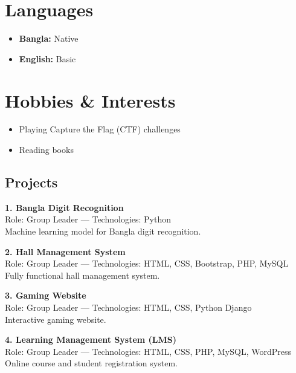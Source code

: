 \documentclass[a4paper,10pt]{article}
\begin{document}
\begin{multicols}{2}
\begin{flushleft}
        \section*{Languages}
        \begin{itemize}[left=0em, labelsep=1em, label=\textbullet, itemsep=0.2em]
            \item \textbf{Bangla:} Native
            \item \textbf{English:} Basic
        \end{itemize}

        \section*{Hobbies \& Interests}
        \begin{itemize}[left=0em, labelsep=1em, label=\textbullet, itemsep=0.2em]
            \item Playing Capture the Flag (CTF) challenges
            \item Reading books
        \end{itemize}
    \end{flushleft}

    \begin{flushleft}
        \section*{Projects}
        \noindent \textbf{1. Bangla Digit Recognition} \\
        Role: Group Leader — Technologies: Python \\
        Machine learning model for Bangla digit recognition.

        \vspace{0.3em}
        \noindent \textbf{2. Hall Management System} \\
        Role: Group Leader — Technologies: HTML, CSS, Bootstrap, PHP, MySQL \\
        Fully functional hall management system.

        \vspace{0.3em}
        \noindent \textbf{3. Gaming Website} \\
        Role: Group Leader — Technologies: HTML, CSS, Python Django \\
        Interactive gaming website.

        \vspace{0.3em}
        \noindent \textbf{4. Learning Management System (LMS)} \\
        Role: Group Leader — Technologies: HTML, CSS, PHP, MySQL, WordPress \\
        Online course and student registration system.


\end{flushleft}
\end{multicols}
\end{document}
